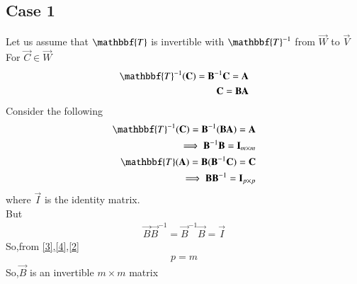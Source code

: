 \documentclass[journal,12pt,twocolumn]{IEEEtran}
\begin{document}
\subsection{Case 1}
Let us assume that $\mathbbf{T}$ is invertible with $\mathbbf{T}^{-1}$ from $\vec{W}$ to $\vec{V}$\\
For $\vec{C} \in \vec{W}$ 
\begin{align}
    \mathbbf{T}^{-1}(\vec{C})=\vec{B}^{-1}\vec{C}=\vec{A} \\
    \vec{C}=\vec{B}\vec{A}
\end{align}
Consider the following
\begin{align}
  \mathbbf{T}^{-1}(\vec{C})=\vec{B}^{-1}(\vec{B}\vec{A})=\vec{A}\\
  \implies \vec{B}^{-1}\vec{B}=\vec{I}_{m \times m}\label{3}\\
  \mathbbf{T}(\vec{A})=\vec{B}(\vec{B}^{-1}\vec{C})=\vec{C}\\
  \implies \vec{B}\vec{B}^{-1}=\vec{I}_{p \times p}\label{4}
\end{align}
where $\vec{I}$ is the identity matrix.\\
But
\begin{align}
    \vec{B}\vec{B}^{-1}=\vec{B}^{-1}\vec{B}=\vec{I}\label{2}
\end{align}
 So,from \eqref{3},\eqref{4},\eqref{2} 
\begin{align}
    p=m
\end{align}
So,$\vec{B}$ is an invertible $m \times m$ matrix
\end{document}
